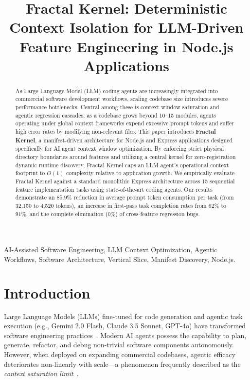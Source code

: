 \documentclass[conference]{IEEEtran}
\begin{document}
\title{Fractal Kernel: Deterministic Context Isolation for LLM-Driven Feature Engineering in Node.js Applications}

\author{
}

\maketitle

\begin{abstract}
As Large Language Model (LLM) coding agents are increasingly integrated into commercial software development workflows, scaling codebase size introduces severe performance bottlenecks. Central among these is context window saturation and agentic regression cascades: as a codebase grows beyond 10--15 modules, agents operating under global context frameworks expend excessive prompt tokens and suffer high error rates by modifying non-relevant files. This paper introduces \textbf{Fractal Kernel}, a manifest-driven architecture for Node.js and Express applications designed specifically for AI agent context window optimization. By enforcing strict physical directory boundaries around features and utilizing a central kernel for zero-registration dynamic runtime discovery, Fractal Kernel caps an LLM agent's operational context footprint to $O(1)$ complexity relative to application growth. We empirically evaluate Fractal Kernel against a standard monolithic Express architecture across 15 sequential feature implementation tasks using state-of-the-art coding agents. Our results demonstrate an $85.9\%$ reduction in average prompt token consumption per task (from 32,150 to 4,520 tokens), an increase in first-pass task completion rates from $62\%$ to $91\%$, and the complete elimination ($0\%$) of cross-feature regression bugs.
\end{abstract}

\begin{IEEEkeywords}
AI-Assisted Software Engineering, LLM Context Optimization, Agentic Workflows, Software Architecture, Vertical Slice, Manifest Discovery, Node.js.
\end{IEEEkeywords}

\section{Introduction}
Large Language Models (LLMs) fine-tuned for code generation and agentic task execution (e.g., Gemini 2.0 Flash, Claude 3.5 Sonnet, GPT-4o) have transformed software engineering practices~\cite{swebench2024, context_degradation2023}. Modern AI agents possess the capability to plan, generate, refactor, and debug non-trivial software components autonomously. However, when deployed on expanding commercial codebases, agentic efficacy deteriorates non-linearly with scale---a phenomenon frequently described as the \textit{context saturation limit}~\cite{loss_in_middle2023}.
\end{document}
